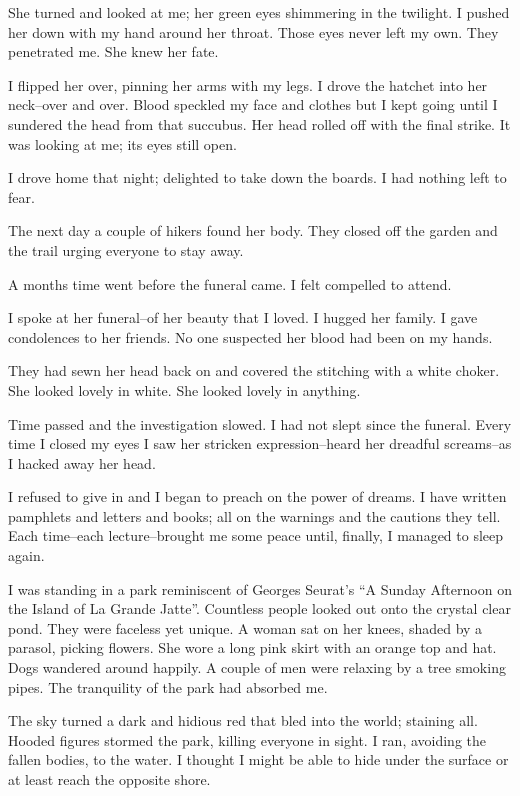 \documentclass{article}
\begin{document}
She turned and looked at me; her green eyes shimmering in the twilight.
I pushed her down with my hand around her throat.
Those eyes never left my own. They penetrated me.
She knew her fate.


I flipped her over, pinning her arms with my legs.
I drove the hatchet into her neck--over and over.
Blood speckled my face and clothes but I kept going
until I sundered the head from that succubus.
Her head rolled off with the final strike.
It was looking at me; its eyes still open.


I drove home that night;
delighted to take down the boards.
I had nothing left to fear.
\VV


\noindent
The next day a couple of hikers found her body.
They closed off the garden and the trail
urging everyone to stay away.


A months time went before the funeral came.
I felt compelled to attend.


I spoke at her funeral--of her beauty that I loved.
I hugged her family.
I gave condolences to her friends.
No one suspected her blood had been on my hands.


They had sewn her head back on and covered the
stitching with a white choker.
She looked lovely in white.
She looked lovely in anything.
\VV


\noindent
Time passed and the investigation slowed.
I had not slept since the funeral.
Every time I closed my eyes I saw her stricken expression--heard
her dreadful screams--as I hacked away her head.


I refused to give in and I began to preach on the power of dreams.
I have written pamphlets and letters and books;
all on the warnings and the cautions they tell.
Each time--each lecture--brought me some peace
until, finally, I managed to sleep again.
\vvvv


\noindent
I was standing in a park reminiscent of
Georges Seurat's ``A Sunday Afternoon on the Island of La Grande Jatte''.
Countless people looked out onto the crystal clear pond.
They were faceless yet unique.
A woman sat on her knees, shaded by a parasol, picking flowers.
She wore a long pink skirt with an orange top and hat.
Dogs wandered around happily.
A couple of men were relaxing by a tree smoking pipes.
The tranquility of the park had absorbed me.


The sky turned a dark and hidious red that bled into the world;
staining all.  Hooded figures stormed the park, killing everyone in sight.
I ran, avoiding the fallen bodies, to the water.
I thought I might be able to hide under the surface or at least
reach the opposite shore.
\end{document}
